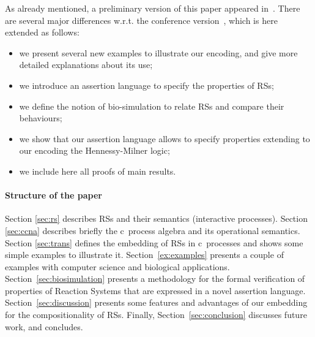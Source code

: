 As already mentioned, a preliminary version of this paper appeared in~\cite{BBF19}.
There are several major differences w.r.t. the conference version~\cite{BBF19}, which is here extended as follows:
\begin{itemize}
\item we present several new examples to illustrate our 
 encoding,
and give more detailed explanations about its use;
\item we introduce an assertion language to specify the properties of RSs;
\item we define the notion of bio-simulation to relate RSs
and compare their behaviours;
\item we show that our assertion language allows to specify properties extending to our
encoding
the Hennessy-Milner logic;
\item we include here all proofs of main results.
\end{itemize}
 
\paragraph{Structure of the paper} 

Section \ref{sec:rs} 
describes RSs and their semantics (interactive processes).
Section \ref{sec:ccna} describes briefly the c\CNA \ process algebra and
its operational semantics.
Section \ref{sec:trans} defines the embedding of RSs in
c\CNA \ processes and shows some simple examples to illustrate 
it.
Section~\ref{ex:examples} presents a couple of examples with computer science and biological applications.
Section~\ref{sec:biosimulation} presents a methodology for the formal verification of
properties of Reaction Systems that are expressed in a novel assertion language.
Section~\ref{sec:discussion} presents some features and 
advantages of our embedding for the compositionality of RSs.
Finally, Section~\ref{sec:conclusion}
discusses future work, and concludes.


